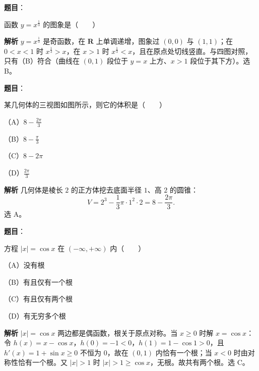 \begin{answer}

\textbf{题目}：

函数 $y=x^{\frac13}$ 的图象是\mbox{（　　）}
\nopagebreak[4]
\begin{center}\end{center}
\nopagebreak[4]
\textbf{解析}
$y=x^{\frac13}$ 是奇函数，在 $\mathbf R$ 上单调递增，图象过 $(0,0)$ 与 $(1,1)$；在 $0<x<1$ 时 $x^{\frac13}>x$，在 $x>1$ 时 $x^{\frac13}<x$，且在原点处切线竖直。与四图对照，只有（B）符合（曲线在 $(0,1)$ 段位于 $y=x$ 上方、$x>1$ 段位于其下方）。选 B。


\end{answer}
\begin{answer}

\textbf{题目}：

某几何体的三视图如图所示，则它的体积是\mbox{（　　）}

（A）$8-\frac{2\pi}3$

（B）$8-\frac{\pi}3$

（C）$8-2\pi$

（D）$\frac{2\pi}3$
\nopagebreak[4]
\begin{center}\end{center}
\nopagebreak[4]
\textbf{解析}
几何体是棱长 $2$ 的正方体挖去底面半径 $1$、高 $2$ 的圆锥：
\nopagebreak[4]
\[V=2^3-\frac13\pi\cdot1^2\cdot2=8-\frac{2\pi}3.\]
选 A。


\end{answer}
\begin{answer}

\textbf{题目}：

方程 $|x|=\cos x$ 在 $(-\infty,+\infty)$ 内\mbox{（　　）}

（A）没有根

（B）有且仅有一个根

（C）有且仅有两个根

（D）有无穷多个根

\textbf{解析}
$|x|=\cos x$ 两边都是偶函数，根关于原点对称。当 $x\geqslant0$ 时解 $x=\cos x$：令 $h(x)=x-\cos x$，$h(0)=-1<0$，$h(1)=1-\cos1>0$，且 $h'(x)=1+\sin x\geqslant0$ 不恒为 $0$，故在 $(0,1)$ 内恰有一个根；当 $x<0$ 时由对称性恰有一个根。又 $|x|>1$ 时 $|x|>1\geqslant\cos x$，无根。故共有两个根。选 C。


\end{answer}
